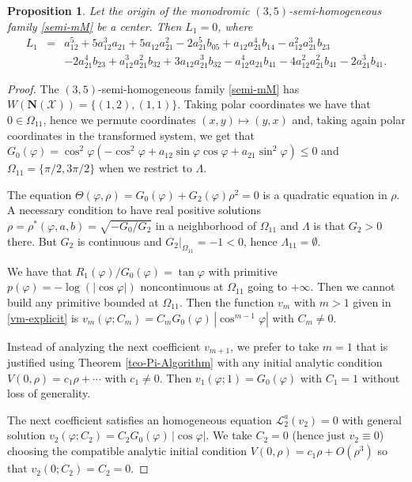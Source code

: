 \documentclass[12pt]{amsart}
\newtheorem {proposition} [theorem]{Proposition}
\begin{document}
\begin{proposition}\label{prop-seihomo-35}
Let the origin of the monodromic $(3, 5)$-semi-homogeneous family \eqref{semi-mM} be a center. Then $L_1 = 0$, where
\begin{eqnarray*}
L_1 &=& a_{12}^5 + 5 a_{12}^3 a_{21} + 5 a_{12} a_{21}^2 - 2 a_{21}^5 b_{05} + a_{12} a_{21}^4 b_{14} -  a_{12}^2 a_{21}^3 b_{23} \\
 &  & - 2 a_{21}^4 b_{23} + a_{12}^3 a_{21}^2 b_{32} + 3 a_{12} a_{21}^3 b_{32} -
 a_{12}^4 a_{21} b_{41} - 4 a_{12}^2 a_{21}^2 b_{41} -
 2 a_{21}^3 b_{41}.
\end{eqnarray*}
\end{proposition}

\begin{proof}
The $(3, 5)$-semi-homogeneous family \eqref{semi-mM} has $W(\mathbf{N}(\mathcal{X})) = \{ (1, 2), (1, 1) \}$. Taking polar coordinates we have that $0 \in \Omega_{11}$, hence we permute coordinates $(x,y) \mapsto (y,x)$ and, taking again polar coordinates in the transformed system, we get that $G_0(\varphi) = \cos^2\varphi (- \cos^2\varphi + a_{12} \sin\varphi \cos\varphi  + a_{21} \sin^2\varphi) \leq 0$ and $\Omega_{11} = \{\pi/2, 3 \pi/2\}$ when we restrict to $\Lambda$.

The equation $\Theta(\varphi, \rho) = G_0(\varphi) + G_2(\varphi) \rho^2 = 0$ is a quadratic equation in $\rho$. A necessary condition to have real positive solutions $\rho=\rho^*(\varphi, a, b) = \sqrt{-G_0/G_2}$ in a neighborhood of $\Omega_{11}$ and $\Lambda$ is that $G_2 > 0$ there. But $G_2$ is continuous and $G_2|_{\Omega_{11}} = -1 < 0$, hence $\Lambda_{11} = \emptyset$.

We have that $R_1(\varphi)/G_0(\varphi) = \tan\varphi$ with primitive $p(\varphi) = -\log(|\cos\varphi|)$ noncontinuous at $\Omega_{11}$ going to $+ \infty$. Then we cannot build any primitive bounded at $\Omega_{11}$. Then the function $v_m$ with $m>1$ given in \eqref{vm-explicit} is $v_m(\varphi; C_m) = C_m G_0(\varphi) \, |\cos^{m-1}\varphi|$ with $C_m \neq 0$.

Instead of analyzing the next coefficient $v_{m+1}$, we prefer to take $m=1$ that is justified using Theorem \ref{teo-Pi-Algorithm} with any initial analytic condition $V(0,\rho) = c_1 \rho + \cdots$ with $c_1 \neq 0$. Then
$v_1(\varphi; 1) = G_0(\varphi)$ with $C_1 =1$ without loss of generality.


The next coefficient satisfies an homogeneous equation $\mathcal{L}^{a}_2(v_2) = 0$ with general solution $v_2(\varphi; C_2) = C_2 G_0(\varphi) \, |\cos\varphi|$. We take $C_2=0$ (hence just $v_2\equiv 0$) choosing the compatible analytic initial condition $V(0,\rho) = c_1 \rho + O(\rho^3)$ so that $v_2(0; C_2) = C_2 = 0$.


\end{proof}
\end{document}

